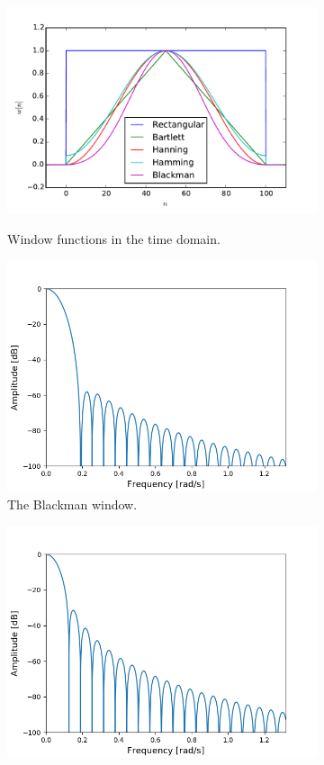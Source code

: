 \begin{figure}[H]
\centering
\begin{subfigure}{0.49\textwidth}
\centering
\includegraphics[width=\textwidth]{figures/filter_teori/window_types.pdf}
\caption{Window functions in the time domain.}
\label{fig:win_type}
\includegraphics[width=\textwidth]{figures/dbplots/blackman.png}
\caption{The Blackman window.}
\label{fig:blackman_db}
\end{subfigure}
\begin{subfigure}{0.49\textwidth}
\centering
\includegraphics[width=\textwidth]{figures/dbplots/hann.png}

\end{subfigure}
\end{figure}

